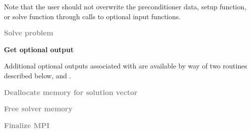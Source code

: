 \begin{Steps}
  Note that the user should not overwrite the preconditioner data, setup function,
  or solve function through calls to {\kinspils} optional input functions.

\item
  \textcolor{gray}{\bf Solve problem}

\item
  {\bf Get optional output}

  Additional optional outputs associated with {\kinbbdpre} are available by 
  way of two routines described below,
   and .

\item
  \textcolor{gray}{\bf Deallocate memory for solution vector}

\item
  \textcolor{gray}{\bf Free solver memory}
  
\item 
  \textcolor{gray}{\bf Finalize MPI}

\end{Steps}

